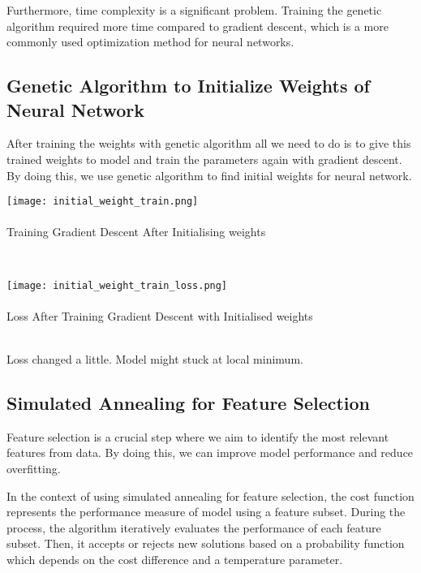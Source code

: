 \documentclass[conference]{IEEEtran}
\begin{document}
Furthermore, time complexity is a significant problem. Training the genetic algorithm required more time compared to gradient descent, which is a more commonly used optimization method for neural networks.

\subsection{Genetic Algorithm to Initialize Weights of Neural Network}

After training the weights with genetic algorithm all we need to do is to give this trained weights to model and train the parameters again with gradient descent. By doing this, we use genetic algorithm to find initial weights for neural network.

\begin{center}
\texttt{[image: initial\_weight\_train.png]}\\ \ \\ 
\footnotesize{Training Gradient Descent After Initialising weights}
\end{center}\\ 

\begin{center}
\texttt{[image: initial\_weight\_train\_loss.png]}\\ \ \\ 
\footnotesize{Loss After Training Gradient Descent with Initialised weights}
\end{center}\\ 

Loss changed a little. Model might stuck at local minimum.


\subsection{Simulated Annealing for Feature Selection}


Feature selection is a crucial step where we aim to identify the most relevant features from data. By doing this, we can improve model performance and reduce overfitting.

In the context of using simulated annealing for feature selection, the cost function represents the performance measure of model using a feature subset. During the process, the algorithm iteratively evaluates the performance of each feature subset. Then, it accepts or rejects new solutions based on a probability function which depends on the cost difference and a temperature parameter.
\end{document}
